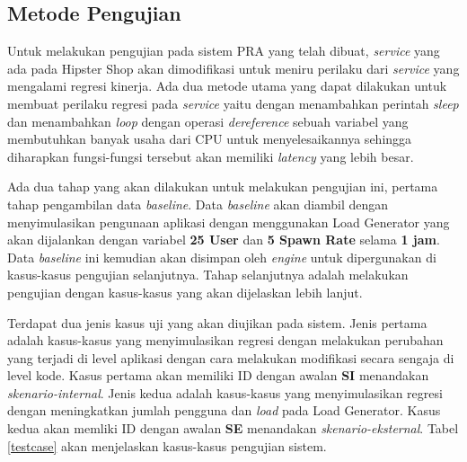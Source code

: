 \pagebreak

\subsection{Metode Pengujian}
\label{metode-pengujian}
Untuk melakukan pengujian pada sistem PRA yang telah dibuat, \textit{service} yang ada pada Hipster Shop akan dimodifikasi untuk meniru perilaku dari \textit{service} yang mengalami regresi kinerja. Ada dua metode utama yang dapat dilakukan untuk membuat perilaku regresi pada \textit{service} yaitu dengan menambahkan perintah \textit{sleep} dan menambahkan \textit{loop} dengan operasi \textit{dereference} sebuah variabel yang membutuhkan banyak usaha dari CPU untuk menyelesaikannya sehingga diharapkan fungsi-fungsi tersebut akan memiliki \textit{latency} yang lebih besar. 

Ada dua tahap yang akan dilakukan untuk melakukan pengujian ini, pertama tahap pengambilan data \textit{baseline}. Data \textit{baseline} akan diambil dengan menyimulasikan pengunaan aplikasi dengan menggunakan Load Generator yang akan dijalankan dengan variabel \textbf{25 User} dan \textbf{5 Spawn Rate} selama \textbf{1 jam}. Data \textit{baseline} ini kemudian akan disimpan oleh \textit{engine} untuk dipergunakan di kasus-kasus pengujian selanjutnya. Tahap selanjutnya adalah melakukan pengujian dengan kasus-kasus yang akan dijelaskan lebih lanjut.

Terdapat dua jenis kasus uji yang akan diujikan pada sistem. Jenis pertama adalah kasus-kasus yang menyimulasikan regresi dengan melakukan perubahan yang terjadi di level aplikasi dengan cara melakukan modifikasi secara sengaja di level kode. Kasus pertama akan memiliki ID dengan awalan \textbf{SI} menandakan \textit{skenario-internal}. Jenis kedua adalah kasus-kasus yang menyimulasikan regresi dengan meningkatkan jumlah pengguna dan \textit{load} pada Load Generator. Kasus kedua akan memliki ID dengan awalan \textbf{SE} menandakan \textit{skenario-eksternal}. Tabel \ref{testcase} akan menjelaskan kasus-kasus pengujian sistem.

